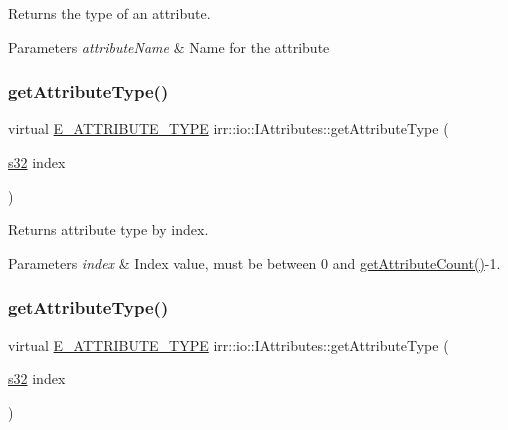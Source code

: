 Returns the type of an attribute. 


\begin{DoxyParams}{Parameters}
{\em attribute\+Name} & Name for the attribute \\
\hline
\end{DoxyParams}
\mbox{\label{classirr_1_1io_1_1IAttributes_a2cb0eb3befcbf7feb2bbdd4676c53954}} 
\subsubsection{\texorpdfstring{get\+Attribute\+Type()}{getAttributeType()}\hspace{0.1cm}{\footnotesize\ttfamily [3/4]}}
{\footnotesize\ttfamily virtual \hyperlink{namespaceirr_1_1io_a874a5f14dbe2e45c40c2bb29e9f0ebcb}{E\+\_\+\+A\+T\+T\+R\+I\+B\+U\+T\+E\+\_\+\+T\+Y\+PE} irr\+::io\+::\+I\+Attributes\+::get\+Attribute\+Type (\begin{DoxyParamCaption}\item[{\hyperlink{namespaceirr_ac66849b7a6ed16e30ebede579f9b47c6}{s32}}]{index }\end{DoxyParamCaption})\hspace{0.3cm}{\ttfamily [pure virtual]}}



Returns attribute type by index. 


\begin{DoxyParams}{Parameters}
{\em index} & Index value, must be between 0 and \hyperlink{classirr_1_1io_1_1IAttributes_a796bdd9440ee7ba0b6742a90a82870b6}{get\+Attribute\+Count()}-\/1. \\
\hline
\end{DoxyParams}
\mbox{\label{classirr_1_1io_1_1IAttributes_a2cb0eb3befcbf7feb2bbdd4676c53954}} 
\subsubsection{\texorpdfstring{get\+Attribute\+Type()}{getAttributeType()}\hspace{0.1cm}{\footnotesize\ttfamily [4/4]}}
{\footnotesize\ttfamily virtual \hyperlink{namespaceirr_1_1io_a874a5f14dbe2e45c40c2bb29e9f0ebcb}{E\+\_\+\+A\+T\+T\+R\+I\+B\+U\+T\+E\+\_\+\+T\+Y\+PE} irr\+::io\+::\+I\+Attributes\+::get\+Attribute\+Type (\begin{DoxyParamCaption}\item[{\hyperlink{namespaceirr_ac66849b7a6ed16e30ebede579f9b47c6}{s32}}]{index }\end{DoxyParamCaption})\hspace{0.3cm}{\ttfamily [pure virtual]}}



